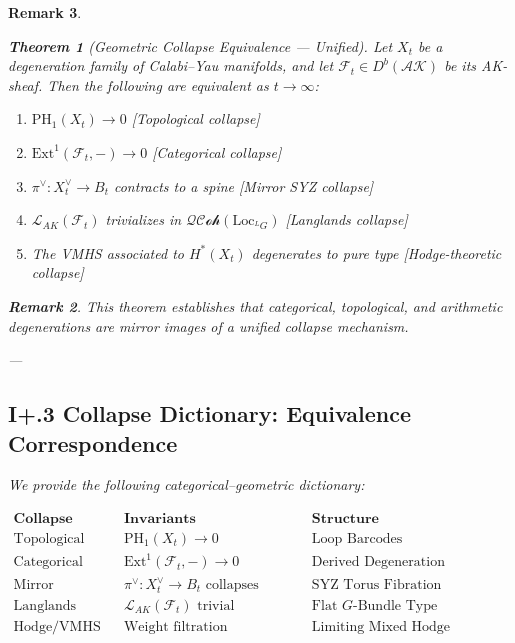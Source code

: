 \documentclass[11pt]{article}
\newtheorem{theorem}{Theorem}[section]
\newtheorem{remark}[theorem]{Remark}
\begin{document}
\begin{remark}
\begin{theorem}[Geometric Collapse Equivalence — Unified]
Let \( X_t \) be a degeneration family of Calabi–Yau manifolds, and let \( \mathcal{F}_t \in D^b(\mathcal{AK}) \) be its AK-sheaf. Then the following are equivalent as \( t \to \infty \):
\begin{enumerate}
  \item \( \mathrm{PH}_1(X_t) \to 0 \) \hfill [Topological collapse]
  \item \( \mathrm{Ext}^1(\mathcal{F}_t, -) \to 0 \) \hfill [Categorical collapse]
  \item \( \pi^\vee: X_t^\vee \to B_t \) contracts to a spine \hfill [Mirror SYZ collapse]
  \item \( \mathcal{L}_{AK}(\mathcal{F}_t) \) trivializes in \( \mathcal{QCoh}(\mathrm{Loc}_{^LG}) \) \hfill [Langlands collapse]
  \item The VMHS associated to \( H^*(X_t) \) degenerates to pure type \hfill [Hodge-theoretic collapse]
\end{enumerate}
\end{theorem}

\begin{remark}
This theorem establishes that categorical, topological, and arithmetic degenerations are mirror images of a unified collapse mechanism.
\end{remark}

---

\subsection*{I+.3 Collapse Dictionary: Equivalence Correspondence}

We provide the following categorical–geometric dictionary:

\[
\begin{array}{lll}
\textbf{Collapse Type} & \textbf{Invariants} & \textbf{Structure} \\
\hline
\text{Topological} & \mathrm{PH}_1(X_t) \to 0 & \text{Loop Barcodes} \\
\text{Categorical} & \mathrm{Ext}^1(\mathcal{F}_t, -) \to 0 & \text{Derived Degeneration} \\
\text{Mirror} & \pi^\vee: X_t^\vee \to B_t \text{ collapses} & \text{SYZ Torus Fibration} \\
\text{Langlands} & \mathcal{L}_{AK}(\mathcal{F}_t) \text{ trivial} & \text{Flat } G\text{-Bundle Type} \\
\text{Hodge/VMHS} & \text{Weight filtration degenerates} & \text{Limiting Mixed Hodge Structure} \\
\end{array}
\]


\end{remark}
\end{document}
